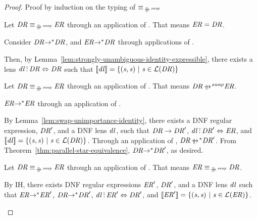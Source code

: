 \documentclass[numbers,10pt,preprint\ifanon ,nocopyrightspace\fi]{sigplanconf}
\begin{document}
\begin{proof}
  Proof by induction on the typing of $\EquivalenceOf{\ParallelRewriteSwap}$
  \begin{case}[\ReflexivityRule]
    Let $\DNFRegex \EquivalenceOf{\ParallelRewriteSwap} \DNFRegexAlt$ through an
    application of \ReflexivityRule{}.
    That means $\mathit{ER} = \mathit{DR}$.

    Consider $\mathit{DR} {\rightarrow}^* \mathit{DR}$, and
    $\mathit{ER} {\rightarrow}^* \mathit{DR}$ through applications
    of \ReflexivityRule{}.

    Then, by Lemma~\ref{lem:strongly-unambiguous-identity-expressible}, there
    exists a lens $\mathit{dl} \,\tilde{:}\, \mathit{DR} \Leftrightarrow
    \mathit{DR}$ such that $[ \! [\mathit{dl}] \! ] = \{(\mathit{s},\mathit{s})
      ~|~ \mathit{s} \in \mathcal{L}(\mathit{DR})\}$
  \end{case}

  \begin{case}[\BaseRule]
    Let $\DNFRegex \EquivalenceOf{\ParallelRewriteSwap} \DNFRegexAlt$ through an
    application of \BaseRule{}.
    That means $\DNFRegex \ParallelRewriteSwap \DNFRegexAlt$.

    $\mathit{ER} {\rightarrow}^* \mathit{ER}$ through an application
    of \ReflexivityRule{}.
    
    By Lemma~\ref{lem:swap-unimportance-identity}, there exists a DNF regular
    expression, $\mathit{DR}'$, and a DNF lens $\mathit{dl}$,
    such that $\mathit{DR} \rightarrow \mathit{DR}'$,
    $\mathit{dl} \,\tilde{:}\, \mathit{DR}' \Leftrightarrow \mathit{ER}$,
    and $[ \! [\mathit{dl}] \! ] =
    \{(\mathit{s},\mathit{s}) ~|~ \mathit{s} \in \mathcal{L}(\mathit{DR})\}$.
    Through an application of \BaseRule{},
    $\DNFRegex \StarOf{\ParallelRewrite} \DNFRegex'$.
    From Theorem~\ref{thm:parallel-star-equivalence},
    $\mathit{DR} {\rightarrow}^* \mathit{DR}'$, as desired.
  \end{case}

  \begin{case}[\SymmetryRule]
    Let $\DNFRegex \EquivalenceOf{\ParallelRewriteSwap} \DNFRegexAlt$ through an
    application of \SymmetryRule{}.
    That means $\DNFRegexAlt \EquivalenceOf{\ParallelRewriteSwap} \DNFRegex$.

    By IH, there exists DNF regular expressions $\mathit{ER}'$, $\mathit{DR}'$,
    and a DNF lens $\mathit{dl}$ such that
    $\mathit{ER} {\rightarrow}^* \mathit{ER}'$,
    $\mathit{DR} {\rightarrow}^* \mathit{DR}'$,
    $\mathit{dl} \,\tilde{:}\, \mathit{ER}' \Leftrightarrow \mathit{DR}'$,
    and $[ \! [\mathit{ER}'] \! ] = \{(\mathit{s},\mathit{s}) ~|~
      \mathit{s} \in \mathcal{L}(\mathit{ER})\}$.


\end{case}
\end{proof}
\end{document}
